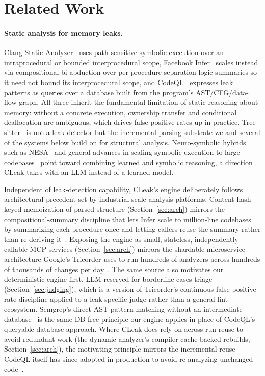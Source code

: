 \documentclass[11pt,a4paper]{article}
\begin{document}
\section{Related Work}
\label{sec:related}

\paragraph{Static analysis for memory leaks.}
Clang Static Analyzer~\cite{clangsa} uses path-sensitive symbolic execution
over an intraprocedural or bounded interprocedural scope, Facebook
Infer~\cite{infer} scales instead via compositional bi-abduction over
per-procedure separation-logic summaries so it need not bound its
interprocedural scope, and CodeQL~\cite{codeql} expresses leak patterns as
queries over a database built from the program's AST/CFG/data-flow graph.
All three inherit the fundamental limitation of static reasoning about
memory: without a concrete execution, ownership transfer and conditional
deallocation are ambiguous, which drives false-positive rates up in
practice. Tree-sitter~\cite{treesitter} is not a leak detector but the
incremental-parsing substrate we and several of the systems below build on
for structural analysis. Neuro-symbolic hybrids such as
NESA~\cite{nesa} and general advances in scaling symbolic execution to
large codebases~\cite{symexec-scaling} point toward combining
learned and symbolic reasoning, a direction CLeak takes with an LLM instead
of a learned model.

Independent of leak-detection capability, CLeak's engine deliberately
follows architectural precedent set by industrial-scale analysis platforms.
Content-hash-keyed memoization of parsed structure (Section~\ref{sec:arch})
mirrors the compositional-summary discipline that lets Infer scale to
million-line codebases by summarizing each procedure once and letting
callers reuse the summary rather than re-deriving it~\cite{infer-verification}.
Exposing the engine as small, stateless, independently-callable MCP
services (Section~\ref{sec:arch}) mirrors the shardable-microservice
architecture Google's Tricorder uses to run hundreds of analyzers across
hundreds of thousands of changes per day~\cite{tricorder}. The same source
also motivates our deterministic-engine-first, LLM-reserved-for-borderline-cases
triage (Section~\ref{sec:judging}), which is a version of Tricorder's
continuous false-positive-rate discipline applied to a leak-specific
judge rather than a general lint ecosystem. Semgrep's direct AST-pattern
matching without an intermediate database~\cite{semgrep} is the same
DB-free principle our engine applies in place of CodeQL's queryable-database
approach. Where CLeak does rely on across-run reuse to avoid redundant
work (the dynamic analyzer's compiler-cache-backed rebuilds,
Section~\ref{sec:arch}), the motivating principle mirrors the incremental
reuse CodeQL itself has since adopted in production to avoid re-analyzing
unchanged code~\cite{codeql-incremental}.
\end{document}
